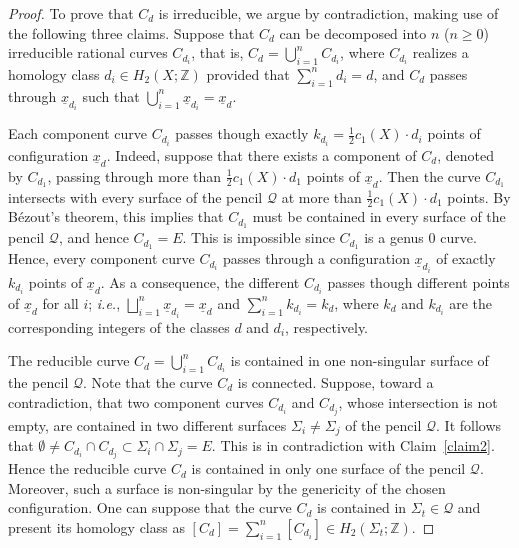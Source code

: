 \documentclass[11pt]{amsart}
\numberwithin{equation}{section}
\theoremstyle{definition}
\theoremstyle{plain}
\theoremstyle{remark}
\newenvironment{claim}[1]{\renewcommand\theinnercustomclaim{#1}\innercustomclaim}{\endinnercustomclaim}
\newcommand{\Z}{\mathbb{Z}}
\begin{document}
\begin{proof}
To prove that $C_d$ is irreducible, we argue by contradiction, making use of the following three claims. Suppose that $C_d$ can be decomposed into $n$ ($n\geq 0$) irreducible rational curves $C_{d_i}$, that is, $C_d=\bigcup_{i=1}^{n} C_{d_i}$, where $C_{d_i}$ realizes a homology class $d_i\in H_2(X;\mathbb{Z})$ provided that $\sum_{i=1}^{n}d_i=d$, and  $C_d$  passes through $\underline{x}_{d_i}$ such that $\bigcup_{i=1}^{n}\underline{x}_{d_i}=\underline{x}_d$.


\begin{claim}{2A}\label{claim2}
  Each component curve $C_{d_i}$ passes though exactly $k_{d_i}=\frac{1}{2}c_1(X)\cdot d_i$ points of configuration $\underline{x}_d$.
  \end{claim} 
Indeed, suppose that there exists a component of $C_d$, denoted by $C_{d_1}$, passing through more than $\frac{1}{2}c_1(X)\cdot d_1$ points of $\underline{x}_d$. Then the curve $C_{d_1}$ intersects with every surface of the pencil $\mathcal{Q}$ at more than $\frac{1}{2}c_1(X)\cdot d_1$ points. By B\'ezout's theorem, this implies that $C_{d_1}$ must be contained in every surface of the pencil $\mathcal{Q}$, and hence $C_{d_1} = E$. This is impossible since $C_{d_1}$ is a genus $0$ curve. Hence, every component curve $C_{d_i}$ passes through a configuration $\underline{x}_{d_i}$ of exactly $k_{d_i}$
points of $\underline{x}_d$. As a consequence, the different $C_{d_i}$ passes though different points of $\underline{x}_d$ for all $i$; \textit{i.e.}, $\bigsqcup_{i=1}^{n}\underline{x}_{d_i}=\underline{x}_d$ and $\sum_{i=1}^{n}k_{d_i}=k_d$, where $k_d$ and $k_{d_i}$ are the corresponding integers of the classes $d$ and $d_i$, respectively.

\begin{claim}{2B}\label{claim2B}
  The reducible curve $C_d=\bigcup_{i=1}^{n} C_{d_i}$ is contained in one non-singular surface of the pencil $\mathcal{Q}$.
\end{claim}
Note that the curve $C_d$ is connected. Suppose, toward a contradiction, that two component curves $C_{d_i}$ and $C_{d_j}$, whose intersection is not empty, are contained in two different surfaces $\Sigma_i\neq \Sigma_j$ of the pencil $\mathcal{Q}$. It follows that $\emptyset \neq C_{d_i}\cap C_{d_j}\subset \Sigma_i\cap\Sigma_j=E$. This is in contradiction with Claim~\ref{claim2}. 
Hence the reducible curve $C_d$ is contained in only one  surface of the pencil $\mathcal{Q}$. Moreover, such a surface is non-singular by the genericity of the chosen configuration. One can suppose that the curve $C_d$ is contained in $\Sigma_t\in \mathcal{Q}$ and  present its homology class as $[C_d]=\sum_{i=1}^{n} [C_{d_i}]\in H_2(\Sigma_t;\Z)$.



\end{proof}
\end{document}
